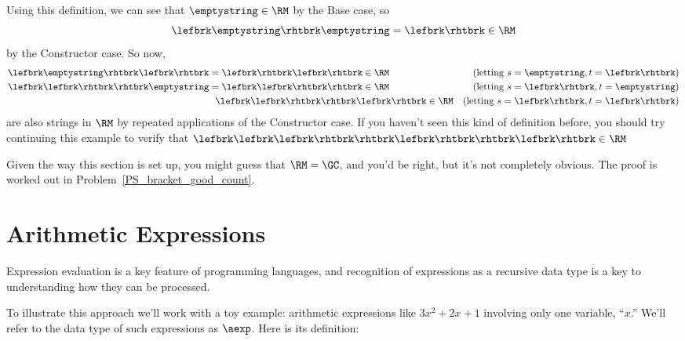 Using this definition, we can see that $\emptystring \in\RM$ by the Base
case, so
\[
\lefbrk\emptystring\rhtbrk\emptystring=\lefbrk\rhtbrk\in\RM
\]
by the Constructor case.  So now,
\begin{align*}
\lefbrk\emptystring\rhtbrk\lefbrk\rhtbrk &= \lefbrk\rhtbrk\lefbrk\rhtbrk \in \RM
    & \text{(letting $s = \emptystring, t = \lefbrk\rhtbrk$)}\\
\lefbrk\lefbrk\rhtbrk\rhtbrk\emptystring & = \lefbrk\lefbrk\rhtbrk\rhtbrk \in \RM
    & \text{(letting $s = \lefbrk\rhtbrk, t = \emptystring$)}\\
&\ \ \lefbrk\lefbrk\rhtbrk\rhtbrk\lefbrk\rhtbrk \in \RM
    & \text{(letting $s = \lefbrk\rhtbrk, t = \lefbrk\rhtbrk$)}
\end{align*}
are also strings in $\RM$ by repeated applications of the Constructor
case.  If you haven't seen this kind of definition before, you should try
continuing this example to verify that
$\lefbrk\lefbrk\lefbrk\rhtbrk\rhtbrk\lefbrk\rhtbrk\rhtbrk\lefbrk\rhtbrk
\in \RM$

Given the way this section is set up, you might guess that $\RM = \GC$,
and you'd be right, but it's not completely obvious.  The proof is worked
out in Problem~\ref{PS_bracket_good_count}.

\section{Arithmetic Expressions}
Expression evaluation is a key feature of programming languages, and
recognition of expressions as a recursive data type is a key to
understanding how they can be processed.

To illustrate this approach we'll work with a toy example: arithmetic
expressions like $3x^2 + 2x + 1$ involving only one variable, ``$x$.''
We'll refer to the data type of such expressions as $\aexp$.  Here is its
definition:

